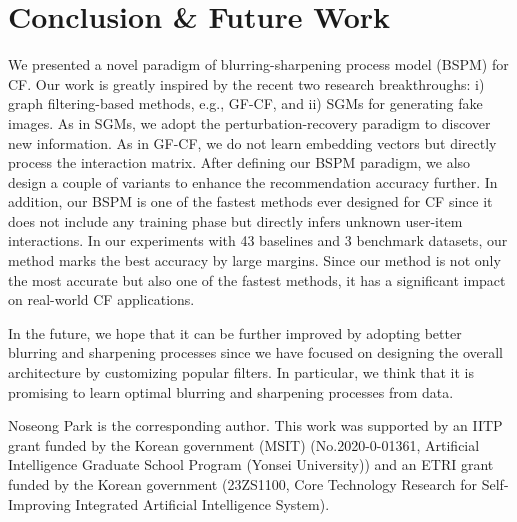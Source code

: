 \documentclass[sigconf,natbib=true]{acmart}
\begin{document}
\section{Conclusion \& Future Work}
We presented a novel paradigm of blurring-sharpening process model (BSPM) for CF. Our work is greatly inspired by the recent two research breakthroughs: i) graph filtering-based methods, e.g., GF-CF, and ii) SGMs for generating fake images. As in SGMs, we adopt the perturbation-recovery paradigm to discover new information. As in GF-CF, we do not learn embedding vectors but directly process the interaction matrix. After defining our BSPM paradigm, we also design a couple of variants to enhance the recommendation accuracy further. In addition, our BSPM is one of the fastest methods ever designed for CF since it does not include any training phase but directly infers unknown user-item interactions. In our experiments with 43 baselines and 3 benchmark datasets, our method marks the best accuracy by large margins. Since our method is not only the most accurate but also one of the fastest methods, it has a significant impact on real-world CF applications.

In the future, we hope that it can be further improved by adopting better blurring and sharpening processes since we have focused on designing the overall architecture by customizing popular filters. In particular, we think that it is promising to learn optimal blurring and sharpening processes from data.

\begin{acks}
Noseong Park is the corresponding author. This work was supported by an IITP grant funded by the Korean government (MSIT) (No.2020-0-01361, Artificial Intelligence Graduate School Program (Yonsei University)) and an ETRI grant funded by the Korean government (23ZS1100, Core Technology Research for Self-Improving Integrated Artificial Intelligence System).
\end{acks}


\end{document}
